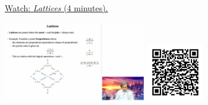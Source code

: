 
\begin{minipage}{10cm}
    \href{https://act4e-spring21.netlify.app/videos/spring2021-tradeoffs:tradeoffs:orders:lattices.html}{Watch: \emph{Lattices} (4 minutes).}
        
    \href{https://act4e-spring21.netlify.app/videos/spring2021-tradeoffs:tradeoffs:orders:lattices.html}{\includegraphics[height=3.5cm]{spring2021-tradeoffs:tradeoffs:orders:lattices/thumbnails.jpg}}
    \href{https://act4e-spring21.netlify.app/videos/spring2021-tradeoffs:tradeoffs:orders:lattices.html}{\includegraphics[height=2.5cm]{spring2021-tradeoffs:tradeoffs:orders:lattices/qrcode.png}}
\end{minipage}
